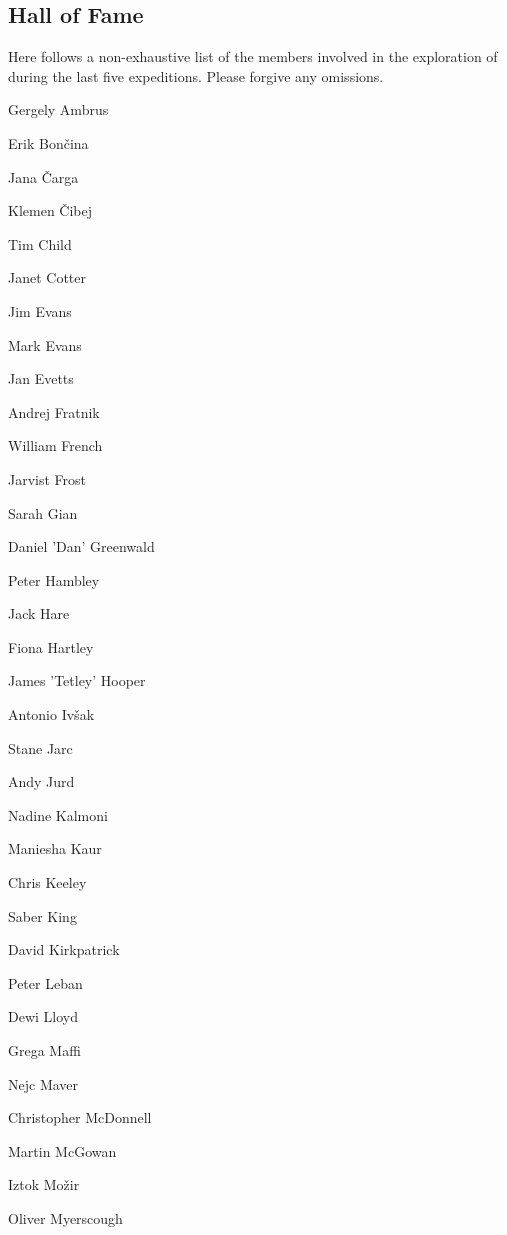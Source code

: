 \begin{tcolorbox}
\begin{fullwidth} 
\chapter{Hall of Fame} 

 Here follows a non-exhaustive list of the members involved in the exploration of  during the last five expeditions. Please forgive any omissions. 

 \begin{multicols}{2} 
 
Gergely Ambrus 
 
Erik Bon\v{c}ina 

Jana \v{C}arga 
 
Klemen \v{C}ibej
 
Tim Child 
 
Janet Cotter 
 
Jim Evans 
 
Mark Evans 
 
Jan Evetts 
 
Andrej Fratnik 
 
William French 
 
Jarvist Frost  
 
Sarah Gian 
 
Daniel 'Dan' Greenwald 
 
Peter Hambley 
 
Jack Hare 
 
Fiona Hartley 
 
James 'Tetley' Hooper 
 
Antonio Iv\v{s}ak 
 
Stane Jarc 
 
Andy Jurd 
 
Nadine Kalmoni  
 
Maniesha Kaur 
 
Chris Keeley 
 
Saber King 
 
David Kirkpatrick 
 
Peter Leban 
 
Dewi Lloyd 
 
Grega Maffi 
 
Nejc Maver 
 
Christopher McDonnell 
 
Martin McGowan 
 
Iztok Mo\v{z}ir  
 
Oliver Myerscough 
 

\end{multicols}
\end{fullwidth}
\end{tcolorbox}
